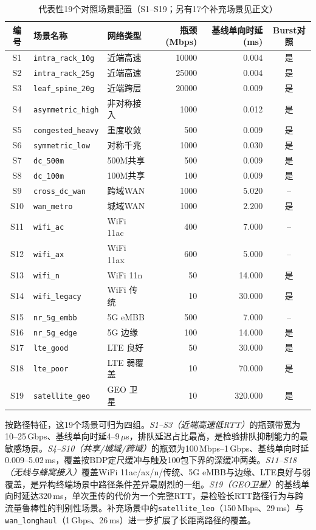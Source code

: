 \begin{table}[htbp]
\centering
\caption{代表性19个对照场景配置（S1--S19；另有17个补充场景见正文）}
\label{tab:scenarios}
\small
\begin{tabular}{|c|l|l|r|r|c|}
\hline
\textbf{编号} & \textbf{场景名称} & \textbf{网络类型} & \textbf{瓶颈(Mbps)} & \textbf{基线单向时延(ms)} & \textbf{Burst对照} \\
\hline
S1 & \texttt{intra\_rack\_10g} & 近端高速 & 10000 & 0.004 & 是 \\
S2 & \texttt{intra\_rack\_25g} & 近端高速 & 25000 & 0.004 & 是 \\
S3 & \texttt{leaf\_spine\_20g} & 近端跨层 & 20000 & 0.009 & 是 \\
S4 & \texttt{asymmetric\_high} & 非对称接入 & 1000 & 0.012 & 是 \\
S5 & \texttt{congested\_heavy} & 重度收敛 & 500 & 0.009 & 是 \\
S6 & \texttt{symmetric\_low} & 对称千兆 & 1000 & 0.030 & 是 \\
S7 & \texttt{dc\_500m} & 500M共享 & 500 & 0.009 & 是 \\
S8 & \texttt{dc\_100m} & 100M共享 & 100 & 0.009 & 是 \\
S9 & \texttt{cross\_dc\_wan} & 跨域WAN & 1000 & 5.020 & -- \\
S10 & \texttt{wan\_metro} & 城域WAN & 1000 & 2.200 & 是 \\
S11 & \texttt{wifi\_ac} & WiFi 11ac & 400 & 7.000 & -- \\
S12 & \texttt{wifi\_ax} & WiFi 11ax & 600 & 5.000 & -- \\
S13 & \texttt{wifi\_n} & WiFi 11n & 50 & 14.000 & 是 \\
S14 & \texttt{wifi\_legacy} & WiFi 传统 & 10 & 30.000 & 是 \\
S15 & \texttt{nr\_5g\_embb} & 5G eMBB & 500 & 7.000 & -- \\
S16 & \texttt{nr\_5g\_edge} & 5G 边缘 & 100 & 14.000 & 是 \\
S17 & \texttt{lte\_good} & LTE 良好 & 50 & 30.000 & 是 \\
S18 & \texttt{lte\_poor} & LTE 弱覆盖 & 10 & 70.000 & 是 \\
S19 & \texttt{satellite\_geo} & GEO 卫星 & 10 & 320.000 & 是 \\
\hline
\end{tabular}
\end{table}

按路径特征，这19个场景可归为四组。\textit{S1--S3（近端高速低RTT）}的瓶颈带宽为10--25\,Gbps、基线单向时延4--9\,$\mu$s，排队延迟占比最高，是检验排队抑制能力的最敏感场景。\textit{S4--S10（共享/城域/跨域）}的瓶颈为100\,Mbps--1\,Gbps、基线单向时延0.009--5.02\,ms，覆盖按BDP定尺缓冲与触及100包下界的深缓冲两类。\textit{S11--S18（无线与蜂窝接入）}覆盖WiFi 11ac/ax/n/传统、5G eMBB与边缘、LTE良好与弱覆盖，是异构终端场景中路径条件差异最剧烈的一组。\textit{S19（GEO卫星）}的基线单向时延达320\,ms，单次重传的代价为一个完整RTT，是检验长RTT路径行为与跨流量鲁棒性的判别性场景。补充场景中的\texttt{satellite\_leo}（150\,Mbps、29\,ms）与\texttt{wan\_longhaul}（1\,Gbps、26\,ms）进一步扩展了长距离路径的覆盖。

